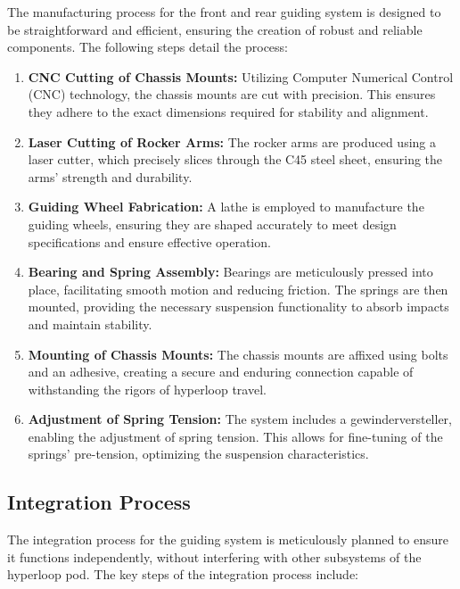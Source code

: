 The manufacturing process for the front and rear guiding system is designed to be straightforward and efficient, ensuring the creation of robust and reliable components. The following steps detail the process:

\begin{enumerate}
    \item \textbf{CNC Cutting of Chassis Mounts:} Utilizing Computer Numerical Control (CNC) technology, the chassis mounts are cut with precision. This ensures they adhere to the exact dimensions required for stability and alignment.
    
    \item \textbf{Laser Cutting of Rocker Arms:} The rocker arms are produced using a laser cutter, which precisely slices through the C45 steel sheet, ensuring the arms' strength and durability.
    
    \item \textbf{Guiding Wheel Fabrication:} A lathe is employed to manufacture the guiding wheels, ensuring they are shaped accurately to meet design specifications and ensure effective operation.
    
    \item \textbf{Bearing and Spring Assembly:} Bearings are meticulously pressed into place, facilitating smooth motion and reducing friction. The springs are then mounted, providing the necessary suspension functionality to absorb impacts and maintain stability.
    
    \item \textbf{Mounting of Chassis Mounts:} The chassis mounts are affixed using bolts and an adhesive, creating a secure and enduring connection capable of withstanding the rigors of hyperloop travel.
    
    \item \textbf{Adjustment of Spring Tension:} The system includes a gewinderversteller, enabling the adjustment of spring tension. This allows for fine-tuning of the springs' pre-tension, optimizing the suspension characteristics.
\end{enumerate}


\subsection{Integration Process}

The integration process for the guiding system is meticulously planned to ensure it functions independently, without interfering with other subsystems of the hyperloop pod. The key steps of the integration process include:


